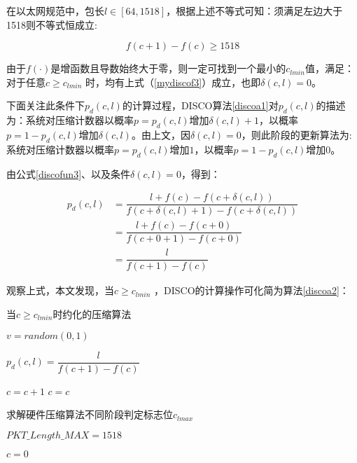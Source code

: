 在以太网规范中，包长$l \in [64,1518]$，根据上述不等式可知：须满足左边大于1518则不等式恒成立:

\begin{equation} \label{mydiscof3}
f(c+1) - f(c) \geq 1518
\end{equation}

由于$ f(\cdot) $是增函数且导数始终大于零，则一定可找到一个最小的$ c_{lmin} $值，满足：对于任意$ c \geq c_{lmin} $ 时，均有上式（\ref{mydiscof3}）成立，也即$\delta(c,l) =0$。

下面关注此条件下$ p_d(c,l) $的计算过程，DISCO算法\ref{discoa1}对$ p_d(c,l) $的描述为：系统对压缩计数器以概率$p= p_d(c,l) $增加$\delta(c,l) +1$，以概率$p=1- p_d(c,l) $增加$\delta(c,l)$。由上文，因$ \delta(c,l)=0$，则此阶段的更新算法为:系统对压缩计数器以概率$p= p_d(c,l) $增加$1$，以概率$p=1- p_d(c,l) $增加$0$。

由公式\ref{discofun3}、以及条件$ \delta(c,l)=0$，得到：

\begin{align}\label{mydiscof4}
p_d(c,l) &= \dfrac{l+f(c)-f(c+\delta(c,l))}{f(c+\delta(c,l)+1)-f(c+\delta(c,l))}  \nonumber \\
&= \dfrac{l+f(c)-f(c+0)}{f(c+0+1)-f(c+0)} \nonumber  \\
&= \dfrac{l}{f(c+1)-f(c)} 
\end{align}



观察上式，本文发现，当$ c \geq c_{lmin} $ ，DISCO的计算操作可化简为算法\ref{discoa2}：

\begin{algorithm}[ht]
	\caption{当$ c \geq c_{lmin} $时约化的压缩算法 \label{discoa2}}
	\IncMargin{2em}
	\DontPrintSemicolon
	$ v = random(0,1) $

	$ p_d(c,l)=\dfrac{l}{f(c+1)-f(c)} $ 
	
	{$ c = c +  1 $ }
	{$ c = c   $ }
\end{algorithm}

\begin{algorithm}[ht]
	\caption{求解硬件压缩算法不同阶段判定标志位$c_{lmax}$  \label{mydiscoa2}}
	\IncMargin{2em}
	\DontPrintSemicolon
	$ 	PKT\_Length\_MAX = 1518 $
	
	$ c=0 $
	
	
\end{algorithm}

